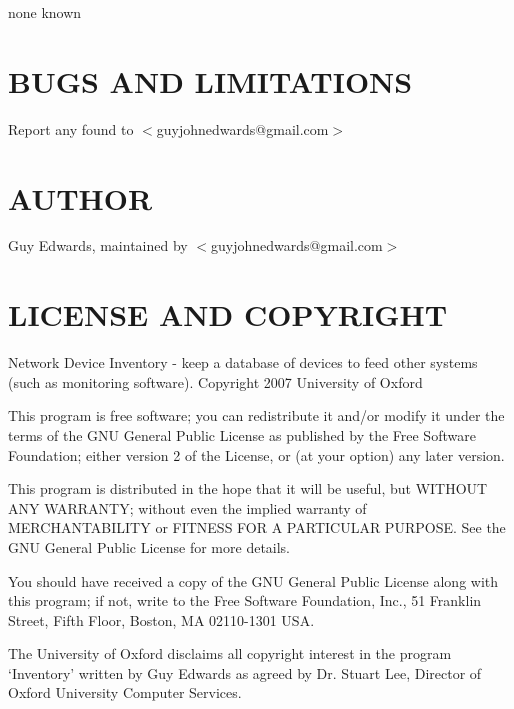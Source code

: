 \documentclass{book}
\begin{document}
none known


\section{BUGS AND LIMITATIONS}
\label{_BUGS_AND_LIMITATIONS}
\hypertarget{_BUGS_AND_LIMITATIONS}{}



Report any found to $<$guyjohnedwards@gmail.com$>$


\section{AUTHOR}
\label{_AUTHOR}
\hypertarget{_AUTHOR}{}



Guy Edwards, maintained by $<$guyjohnedwards@gmail.com$>$


\section{LICENSE AND COPYRIGHT}
\label{_LICENSE_AND_COPYRIGHT}
\hypertarget{_LICENSE_AND_COPYRIGHT}{}



Network Device Inventory - keep a database of devices to feed other systems (such as monitoring software). Copyright 2007 University of Oxford



This program is free software; you can redistribute it and/or modify it under the terms of the GNU General Public License as published by the Free Software Foundation; either version 2 of the License, or (at your option) any later version.



This program is distributed in the hope that it will be useful, but WITHOUT ANY WARRANTY; without even the implied warranty of MERCHANTABILITY or FITNESS FOR A PARTICULAR PURPOSE. See the GNU General Public License for more details.



You should have received a copy of the GNU General Public License along with this program; if not, write to the Free Software Foundation, Inc., 51 Franklin Street, Fifth Floor, Boston, MA 02110-1301 USA.



The University of Oxford disclaims all copyright interest in the program `Inventory' written by Guy Edwards as agreed by Dr. Stuart Lee, Director of Oxford University Computer Services.
\end{document}
